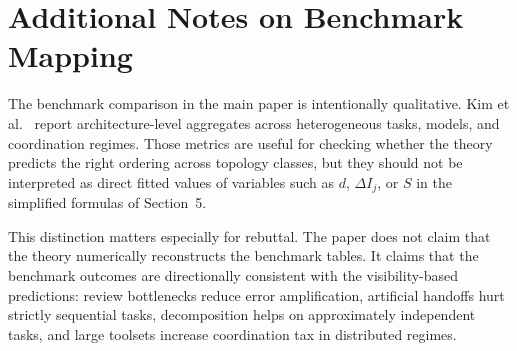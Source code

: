 \section{Additional Notes on Benchmark Mapping}

The benchmark comparison in the main paper is intentionally qualitative. Kim et al.~\cite{kim2025scaling}
report architecture-level aggregates across heterogeneous tasks, models, and coordination regimes. Those
metrics are useful for checking whether the theory predicts the right ordering across topology classes,
but they should not be interpreted as direct fitted values of variables such as $d$, $\Delta I_j$, or
$S$ in the simplified formulas of Section~5.

This distinction matters especially for rebuttal. The paper does not claim that the theory numerically
reconstructs the benchmark tables. It claims that the benchmark outcomes are directionally consistent with
the visibility-based predictions: review bottlenecks reduce error amplification, artificial handoffs hurt
strictly sequential tasks, decomposition helps on approximately independent tasks, and large toolsets
increase coordination tax in distributed regimes.
